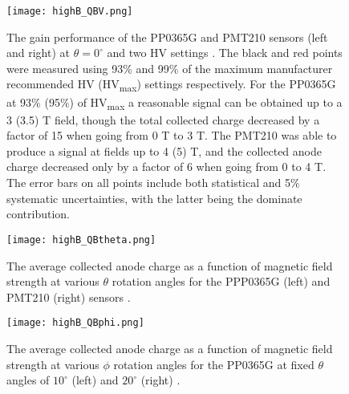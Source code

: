 \begin{figure}[!htb]
	\centering
	\texttt{[image: highB\_QBV.png]}
	\caption[The gain performance of the PP0365G and PMT210 sensors (left and right) at $\theta = 0^{\circ}$ and two HV settings.]{The gain performance of the PP0365G and PMT210 sensors (left and right) at $\theta = 0^{\circ}$ and two HV settings \cite{HighB_DIRC2015}. The black and red points were measured using 93\% and 99\% of the maximum manufacturer recommended HV (HV\textsubscript{max}) settings respectively. For the PP0365G at 93\% (95\%) of HV\textsubscript{max} a reasonable signal can be obtained up to a 3 (3.5) T field, though the total collected charge decreased by a factor of 15 when going from 0 T to 3 T. The PMT210 was able to produce a signal at fields up to 4 (5) T, and the collected anode charge decreased only by a factor of 6 when going from 0 to 4 T. The error bars on all points include both statistical and 5\% systematic uncertainties, with the latter being the dominate contribution.}
	\label{fig:highB_nominal_HV}
\end{figure}

\begin{figure}[!htb]
	\centering
	\texttt{[image: highB\_QBtheta.png]}
	\caption[The average collected anode charge as a function of magnetic field strength at various $\theta$ rotation angles for the PPP0365G (left) and PMT210 (right) sensors.]{The average collected anode charge as a function of magnetic field strength at various $\theta$ rotation angles for the PPP0365G (left) and PMT210 (right) sensors \cite{HighB_DIRC2015}.}
	\label{fig:highB_QBtheta}
\end{figure}

\begin{figure}[!htb]
	\centering
	\texttt{[image: highB\_QBphi.png]}
	\caption[The average collected anode charge as a function of magnetic field strength at various $\phi$ rotation angles for the PP0365G at fixed $\theta$ angles of $10^\circ$ (left) and $20^\circ$ (right).]{The average collected anode charge as a function of magnetic field strength at various $\phi$ rotation angles for the PP0365G at fixed $\theta$ angles of $10^\circ$ (left) and $20^\circ$ (right) \cite{HighB_DIRC2015}.}
	\label{fig:highB_QBphi}
\end{figure}

